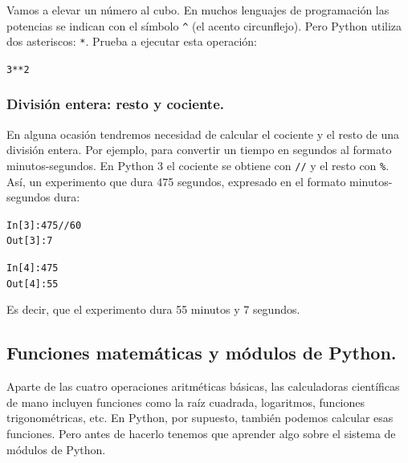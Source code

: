 \documentclass[10pt,a4paper]{article}\usepackage[]{graphicx}\usepackage[]{color}
\makeatletter
\newcommand{\hlnum}[1]{\textcolor[rgb]{0.686,0.059,0.569}{#1}}%
\newcommand{\hlopt}[1]{\textcolor[rgb]{0,0,0}{#1}}%
\newenvironment{kframe}{%
 \def\at@end@of@kframe{}%
 \ifinner\ifhmode%
  \def\at@end@of@kframe{\end{minipage}}%
  \begin{minipage}{\columnwidth}%
 \fi\fi%
 \def\FrameCommand##1{\hskip\@totalleftmargin \hskip-\fboxsep
 \colorbox{shadecolor}{##1}\hskip-\fboxsep
     \hskip-\linewidth \hskip-\@totalleftmargin \hskip\columnwidth}%
 \MakeFramed {\advance\hsize-\width
   \@totalleftmargin\z@ \linewidth\hsize
   \@setminipage}}%
 {\par\unskip\endMakeFramed%
 \at@end@of@kframe}
\newenvironment{knitrout}{}{} %
\makeatother
\begin{document}
Vamos a elevar un número al cubo. En muchos lenguajes de programación las potencias se indican con el símbolo \verb#^# (el acento circunflejo). Pero Python utiliza dos asteriscos: {\tt **}. Prueba a ejecutar esta operación:

\begin{knitrout}
\color{fgcolor}\begin{kframe}
\begin{alltt}
\hlnum{3}\hlopt{**}\hlnum{2}
\end{alltt}
\end{kframe}
\end{knitrout}

\subsubsection*{División entera: resto y cociente.}

En alguna ocasión tendremos necesidad de calcular el cociente y el resto de una división entera. Por ejemplo, para convertir un tiempo en segundos al formato minutos-segundos. En Python 3 el cociente se obtiene con {\tt //} y el resto con \verb#%#. Así, un experimento que dura 475 segundos, expresado en el formato minutos-segundos dura:
\begin{knitrout}
\color{fgcolor}\begin{kframe}
\begin{alltt}
In [3]: 475 // 60
Out[3]: 7

In [4]: 475 %
Out[4]: 55
\end{alltt}
\end{kframe}
\end{knitrout}
Es decir, que el experimento dura 55 minutos y 7 segundos.

\subsection{Funciones matemáticas y módulos de Python.}
\label{tut02:subsec:FuncionesMatematicasModulosPython}

Aparte de las cuatro operaciones aritméticas básicas, las calculadoras científicas de mano incluyen funciones como la raíz cuadrada, logaritmos, funciones trigonométricas, etc. En Python, por supuesto, también podemos calcular esas funciones. Pero antes de hacerlo tenemos que aprender algo sobre el sistema de módulos de Python.
\end{document}
